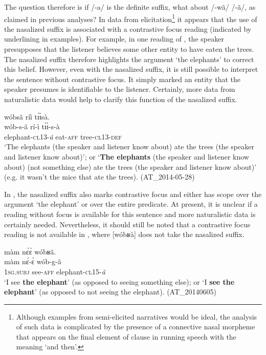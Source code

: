 \documentclass[output=paper]{langsci/langscibook}
\begin{document}
The question therefore is if /-a/ is the definite suffix, what about /-wã/ {\Tilde} /-ã/, as claimed in previous analyses? In data from elicitation\footnote{Although examples from semi-elicited narratives would be ideal, the analysis of such data is complicated by the presence of a connective nasal morpheme that appears on the final element of clause in running speech with the meaning ‘and then’.} it appears that the use of the nasalized suffix is associated with a contrastive focus reading (indicated by underlining in examples). For example, in one reading of , the speaker presupposes that the listener believes some other entity to have eaten the trees. The nasalized suffix therefore highlights the argument ‘the elephants’ to correct this belief. However, even with the nasalized suffix, it is still possible to interpret the sentence without contrastive focus. It simply marked an entity that the speaker presumes is identifiable to the listener. Certainly, more data from naturalistic data would help to clarify this function of the nasalized suffix.

\ea\label{ex:teo:45}
\glll wóbsã{\rmfnm} ríì t\'ɪ\`ɪsà.\\
 wób-s-ã rí-ì t\`ɪ\`ɪ-s-à\\
elephant-\textsc{cl13-}\textit{ã} eat-\textsc{aff} tree-\textsc{cl13-def}\\
\glt ‘The elephants (the speaker and listener know about) ate the trees (the speaker and listener know about)’; or ‘\textbf{The elephants} (the speaker and listener know about) (not something else) ate the trees (the speaker and listener know about)’ (e.g. it wasn’t the mice that ate the trees). (AT\_2014-05-28)
\z
{}

In , the nasalized suffix also marks contrastive focus and either has scope over the argument ‘the elephant’ or over the entire predicate. At present, it is unclear if a reading without focus is available for this sentence and more naturalistic data is certainly needed. Nevertheless, it should still be noted that a contrastive focus reading is not available in , where [wóbʁà] does not take the nasalized suffix.


\ea\label{ex:teo:46}
\glll màm n\'ɛ\`ɛ wóbʁã.\\
 màm n\'ɛ-\`ɛ wób-g-ã\\
\textsc{1sg.subj} see-\textsc{aff} elephant-\textsc{cl15}-\textit{ã}\\
\glt ‘I see \textbf{the elephant}’ (as opposed to seeing something else); or ‘I \textbf{see the elephant}’ (as opposed to not seeing the elephant). (AT\_20140605)
\z
\end{document}

